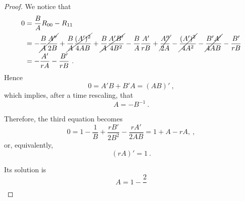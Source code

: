 \begin{proof}
        We notice that
        \begin{equation*}
        \begin{aligned}
            0 & = \frac{B}{A} R_{00} - R_{11} \\ & = - \cancel{\frac{B}{A} \frac{A''}{2B}} + \cancel{\frac{B}{A} \frac{(A')^2}{4 AB}} + \cancel{ \frac{B}{A} \frac{A'B'}{4B^2}} - \frac{B}{A} \frac{A'}{rB} + \cancel{\frac{A''}{2A}} - \cancel{\frac{(A')^2}{4A^2}} - \cancel{\frac{B'A'}{4AB}} - \frac{B'}{rB} \\ & = - \frac{A'}{rA} - \frac{B'}{rB} ~.
        \end{aligned}
        \end{equation*}
        Hence 
        \begin{equation*}
            0 = A' B + B' A = (AB)' ~,
        \end{equation*}
        which implies, after a time rescaling, that 
        \begin{equation*}
            A = - B^{-1} ~.
        \end{equation*}

        Therefore, the third equation becomes 
        \begin{equation*}
            0 = 1 - \frac{1}{B} + \frac{rB'}{2B^2} - \frac{rA'}{2AB} = 1 + A - rA, ~,
        \end{equation*}
        or, equivalently, 
        \begin{equation*}
            (rA)' = 1 ~. 
        \end{equation*}

        Its solution is 
        \begin{equation*}
            A = 1 - \frac{2}{}
        \end{equation*}
    \end{proof}